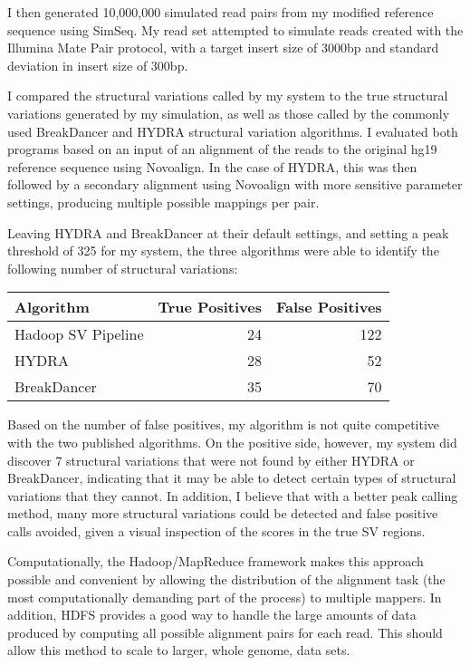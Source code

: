 \documentclass[11pt]{amsart}
\begin{document}
I then generated 10,000,000 simulated read pairs from my modified reference sequence using SimSeq\cite{SimSeq}. My read set attempted to simulate reads created with the Illumina Mate Pair protocol, with a target insert size of 3000bp and standard deviation in insert size of 300bp.

I compared the structural variations called by my system to the true structural variations generated by my simulation, as well as those called by the commonly used BreakDancer\cite{Chen:2009p3} and HYDRA\cite{Quinlan:2010p6} structural variation algorithms. I evaluated both programs based on an input of an alignment of the reads to the original hg19 reference sequence using Novoalign\cite{novo}. In the case of HYDRA, this was then followed by a secondary alignment using Novoalign with more sensitive parameter settings, producing multiple possible mappings per pair. 

Leaving HYDRA and BreakDancer at their default settings, and setting a peak threshold of 325 for my system, the three algorithms were able to identify the following number of structural variations:

\begin{center}
\begin{tabular}{ | l | r | r | }
  \hline
  Algorithm & True Positives & False Positives \\
  \hline
  Hadoop SV Pipeline & 24 & 122 \\
  HYDRA & 28 & 52 \\
  BreakDancer & 35 & 70 \\
\hline  
\end{tabular}
\end{center}

Based on the number of false positives, my algorithm is not quite competitive with the two published algorithms. On the positive side, however, my system did discover 7 structural variations that were not found by either HYDRA or BreakDancer, indicating that it may be able to detect certain types of structural variations that they cannot. In addition, I believe that with a better peak calling method, many more structural variations could be detected and false positive calls avoided, given a visual inspection of the scores in the true SV regions.

Computationally, the Hadoop/MapReduce framework makes this approach possible and convenient by allowing the distribution of the alignment task (the most computationally demanding part of the process) to multiple mappers. In addition, HDFS provides a good way to handle the large amounts of data produced by computing all possible alignment pairs for each read. This should allow this method to scale to larger, whole genome, data sets.




\end{document}
